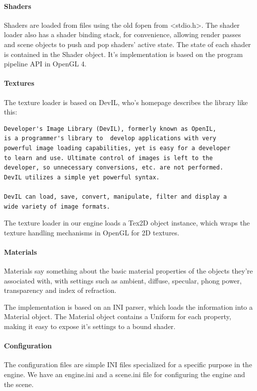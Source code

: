 \paragraph{Shaders}
Shaders are loaded from files using the old fopen from \textless stdio.h\textgreater . The shader loader also has a shader binding stack, for convenience, allowing render passes and scene objects to push and pop shaders' active state.
The state of each shader is contained in the Shader object. It's implementation is based on the program pipeline API in OpenGL 4.

\paragraph{Textures}
The texture loader is based on DevIL, who's homepage \cite{devil_homepage} describes the library like this:
\begin{Verbatim}[frame=single,fontshape=it,framesep=1mm]
Developer's Image Library (DevIL), formerly known as OpenIL, 
is a programmer's library to  develop applications with very
powerful image loading capabilities, yet is easy for a developer
to learn and use. Ultimate control of images is left to the 
developer, so unnecessary conversions, etc. are not performed.
DevIL utilizes a simple yet powerful syntax. 

DevIL can load, save, convert, manipulate, filter and display a 
wide variety of image formats.
\end{Verbatim}

The texture loader in our engine loads a Tex2D object instance, which wraps the texture handling mechanisms in OpenGL for 2D textures.

\paragraph{Materials}
Materials say something about the basic material properties of the objects they're associated with, with settings such as ambient, diffuse, specular, phong power, transparency and index of refraction.

The implementation is based on an INI parser, which loads the information into a Material object. The Material object contains a Uniform for each property, making it easy to expose it's settings to a bound shader.

\paragraph{Configuration}
The configuration files are simple INI files specialized for a specific purpose in the engine. We have an engine.ini and a scene.ini file for configuring the engine and the scene.

